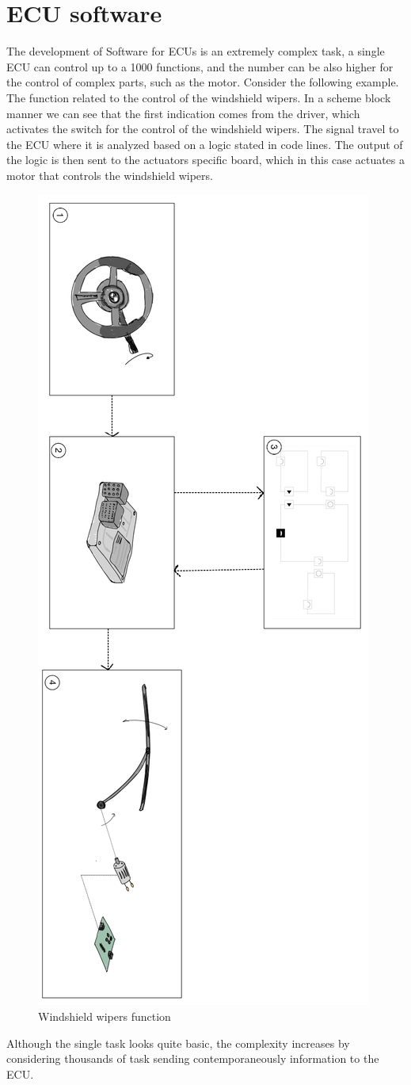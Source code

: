 \documentclass[../main.tex]{subfiles}
\begin{document}
\section{\gls{ECU} software}
The development of Software for \gls{ECU}s is an extremely complex task, a single \gls{ECU} can control up to a 1000 functions, and the number can be also higher for the control of complex parts, such as the motor.
Consider the following example. The function related to the control of the windshield wipers. In a scheme block manner we can see that the first indication comes from the driver, which activates the switch for the control of the windshield wipers. The signal travel to the \gls{ECU} where it is analyzed based on a logic stated in code lines. The output of the logic is then sent to the actuators specific board, which in this case actuates a motor that controls the windshield wipers.\\
\begin{figure}[H]
    \centering
    \includegraphics[width=0.45\linewidth, angle = 90]{images_folder/windshieldwipersfunction.jpeg}
    \caption{Windshield wipers function}
    \label{fig:WWFunct}
\end{figure}
Although the single task looks quite basic, the complexity increases by considering thousands of task sending contemporaneously information to the \gls{ECU}.
\end{document}
